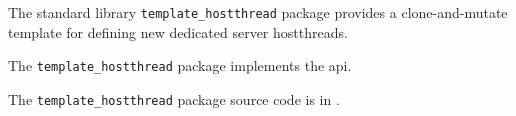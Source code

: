
The standard library {\tt template\_hostthread} package provides a clone-and-mutate template 
for defining new dedicated server hostthreads.

The {\tt template\_hostthread} package implements the  api.

The {\tt template\_hostthread} package source code is in .



